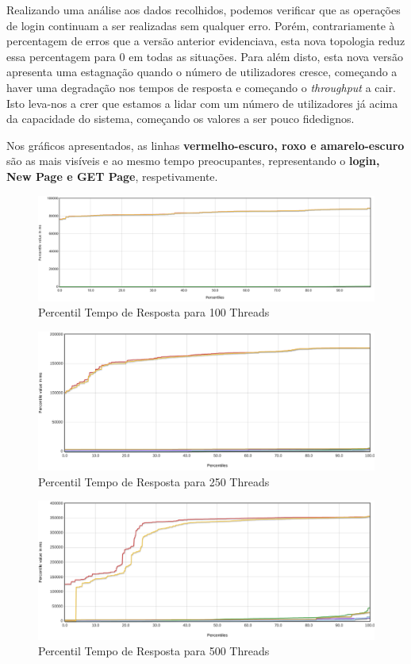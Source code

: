 Realizando uma análise aos dados recolhidos, podemos verificar que as operações de login continuam a ser realizadas sem qualquer erro. Porém, contrariamente à percentagem de erros que a versão anterior evidenciava, esta nova topologia reduz essa percentagem para 0 em todas as situações. Para além disto, esta nova versão apresenta uma estagnação quando o número de utilizadores cresce, começando a haver uma degradação nos tempos de resposta e começando o \textit{throughput} a cair. Isto leva-nos a crer que estamos a lidar com um número de utilizadores já acima da capacidade do sistema, começando os valores a ser pouco fidedignos.

Nos gráficos apresentados, as linhas \textbf{vermelho-escuro, roxo e amarelo-escuro} são as mais visíveis e ao mesmo tempo preocupantes, representando o \textbf{login, New Page e GET Page}, respetivamente.
\pagebreak

\begin{figure}[ht!]
    \centering
    \includegraphics[width=.85\linewidth]{img/testes/i2-t4-100.png}
    \caption{Percentil Tempo de Resposta para 100 Threads}
\end{figure}

\begin{figure}[ht!]
    \centering
    \includegraphics[width=.85\linewidth]{img/testes/i2-t4-250.png}
    \caption{Percentil Tempo de Resposta para 250 Threads}
\end{figure}

\begin{figure}[ht!]
    \centering
    \includegraphics[width=.85\linewidth]{img/testes/i2-t4-500.png}
    \caption{Percentil Tempo de Resposta para 500 Threads}
\end{figure}

